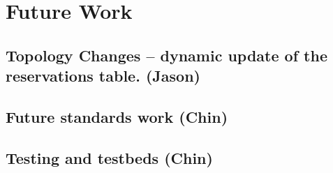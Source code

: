 \documentclass[conference]{IEEEtran}
\begin{document}
\section{Future Work}
\subsection{Topology Changes -- dynamic update of the reservations table. (Jason)}
\subsection{Future standards work (Chin)}
\subsection{Testing and testbeds (Chin)}


%


%
\end{document}
